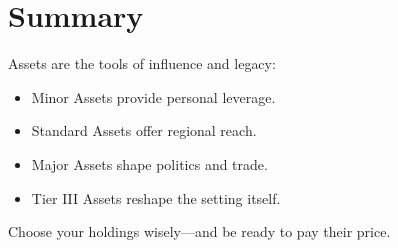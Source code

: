 \section{Summary}

Assets are the tools of influence and legacy:

\begin{itemize}
  \item Minor Assets provide personal leverage.
  \item Standard Assets offer regional reach.
  \item Major Assets shape politics and trade.
  \item Tier III Assets reshape the setting itself.
\end{itemize}

Choose your holdings wisely—and be ready to pay their price.

